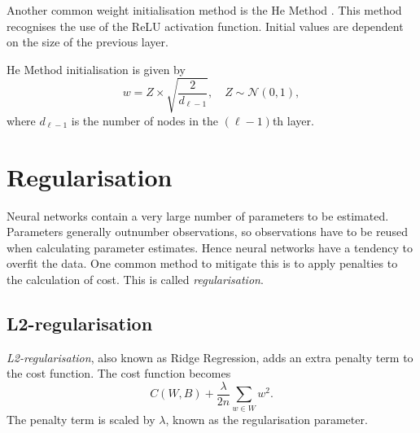 Another common weight initialisation method is the He Method \cite{HeKaiming2015DDiR}. This method recognises the use of the ReLU activation function. Initial values are dependent on the size of the previous layer.

He Method initialisation is given by
\[
	w = Z\times\sqrt{\dfrac{2}{d_{\ell-1}}},\quad Z\sim\mathcal{N}(0,1),
\]
where $d_{\ell-1}$ is the number of nodes in the $(\ell-1)$th layer.



\section{Regularisation}\label{nnet-reg}

Neural networks contain a very large number of parameters to be estimated. Parameters generally outnumber observations, so observations have to be reused when calculating parameter estimates. Hence neural networks have a tendency to overfit the data. One common method to mitigate this is to apply penalties to the calculation of cost. This is called \textit{regularisation}.

\subsection*{L2-regularisation}\label{nnet-l2reg}


\textit{L2-regularisation}, also known as Ridge Regression, adds an extra penalty term to the cost function. The cost function becomes
\[
	C(W,B) + \dfrac{\lambda}{2n}\sum_{w\in W}w^2.
\]
The penalty term is scaled by $\lambda$, known as the regularisation parameter. 

